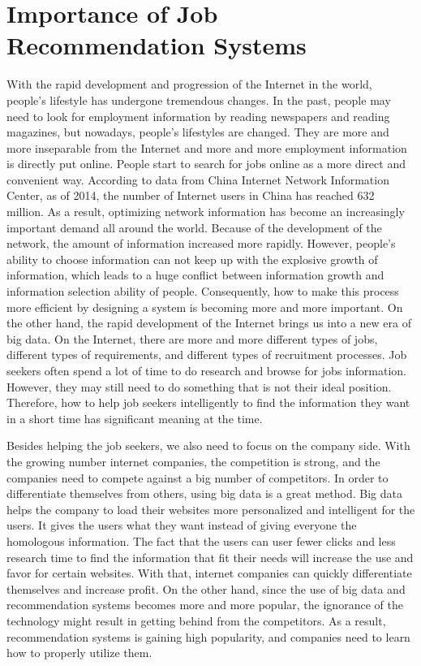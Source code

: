 \documentclass[sigconf]{acmart}
\begin{document}
\section{Importance of Job Recommendation Systems}
With the rapid development and progression of the Internet in the world, people's lifestyle has undergone tremendous changes. In the past, people may need to look for employment information by reading newspapers and reading magazines, but nowadays, people's lifestyles are changed. They are more and more inseparable from the Internet and more and more employment information is directly put online. People start to search for jobs online as a more direct and convenient way. According to data from China Internet Network Information Center, as of 2014, the number of Internet users in China has reached 632 million. As a result, optimizing network information has become an increasingly important demand all around the world. Because of the development of the network, the amount of information increased more rapidly. However, people's ability to choose information can not keep up with the explosive growth of information, which leads to a huge conflict between information growth and information selection ability of people. Consequently, how to make this process more efficient by designing a system is becoming more and more important. On the other hand, the rapid development of the Internet brings us into a new era of big data. On the Internet, there are more and more different types of jobs, different types of requirements, and different types of recruitment processes. Job seekers often spend a lot of time to do research and browse for jobs information. However, they may still need to do something that is not their ideal position. Therefore, how to help job seekers intelligently to find the information they want in a short time has significant meaning at the time.

\par Besides helping the job seekers, we also need to focus on the company side. With the growing number internet companies, the competition is strong, and the companies need to compete against a big number of competitors. In order to differentiate themselves from others, using big data is a great method. Big data helps the company to load their websites more personalized and intelligent for the users. It gives the users what they want instead of giving everyone the homologous information. The fact that the users can user fewer clicks and less research time to find the information that fit their needs will increase the use and favor for certain websites. With that, internet companies can quickly differentiate themselves and increase profit. On the other hand, since the use of big data and recommendation systems becomes more and more popular, the ignorance of the technology might result in getting behind from the competitors. As a result, recommendation systems is gaining high popularity, and companies need to learn how to properly utilize them.
\end{document}

